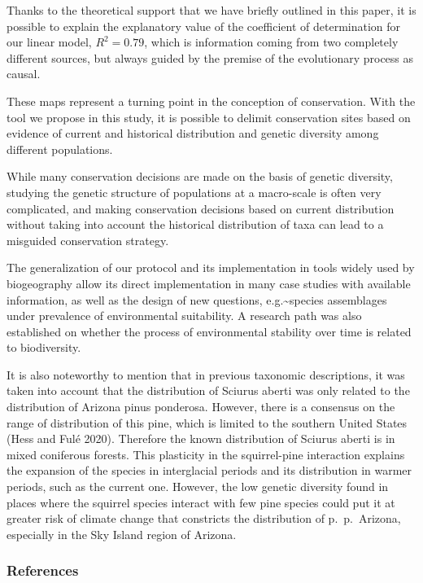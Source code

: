 \documentclass[
]{article}
\begin{document}
Thanks to the theoretical support that we have briefly outlined in this
paper, it is possible to explain the explanatory value of the
coefficient of determination for our linear model, \(R^{2} = 0.79\),
which is information coming from two completely different sources, but
always guided by the premise of the evolutionary process as causal.

These maps represent a turning point in the conception of conservation.
With the tool we propose in this study, it is possible to delimit
conservation sites based on evidence of current and historical
distribution and genetic diversity among different populations.

While many conservation decisions are made on the basis of genetic
diversity, studying the genetic structure of populations at a
macro-scale is often very complicated, and making conservation decisions
based on current distribution without taking into account the historical
distribution of taxa can lead to a misguided conservation strategy.

The generalization of our protocol and its implementation in tools
widely used by biogeography allow its direct implementation in many case
studies with available information, as well as the design of new
questions, e.g.\textasciitilde species assemblages under prevalence of
environmental suitability. A research path was also established on
whether the process of environmental stability over time is related to
biodiversity.

It is also noteworthy to mention that in previous taxonomic
descriptions, it was taken into account that the distribution of Sciurus
aberti was only related to the distribution of Arizona pinus ponderosa.
However, there is a consensus on the range of distribution of this pine,
which is limited to the southern United States (Hess and Fulé 2020).
Therefore the known distribution of Sciurus aberti is in mixed
coniferous forests. This plasticity in the squirrel-pine interaction
explains the expansion of the species in interglacial periods and its
distribution in warmer periods, such as the current one. However, the
low genetic diversity found in places where the squirrel species
interact with few pine species could put it at greater risk of climate
change that constricts the distribution of p.~p.~Arizona, especially in
the Sky Island region of Arizona.

\hypertarget{references}{%
\subsubsection*{References}\label{references}}
\end{document}
